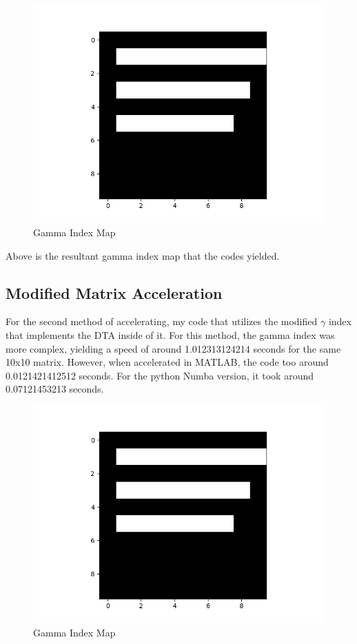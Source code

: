 \documentclass[12pt]{article}
\begin{document}
\begin{figure}[h]
  \centering
  \includegraphics[scale=0.3]{images/gamma.png}
  \caption{Gamma Index Map}
  \label{fig:mat}
\end{figure}

Above is the resultant gamma index map that the codes yielded.
\subsection{Modified Matrix Acceleration}
For the second method of accelerating, my code that utilizes the modified $\gamma$ index that implements the DTA inside of it. For this method, the gamma index was more complex, yielding a speed of around 1.012313124214 seconds for the same 10x10 matrix. However, when accelerated in MATLAB, the code too around 0.0121421412512 seconds. For the python Numba version, it took around 0.07121453213 seconds.


\begin{figure}[h]
  \centering
  \includegraphics[scale=0.3]{images/gamma.png}
  \caption{Gamma Index Map}
  \label{fig:mat}
\end{figure}
\end{document}
